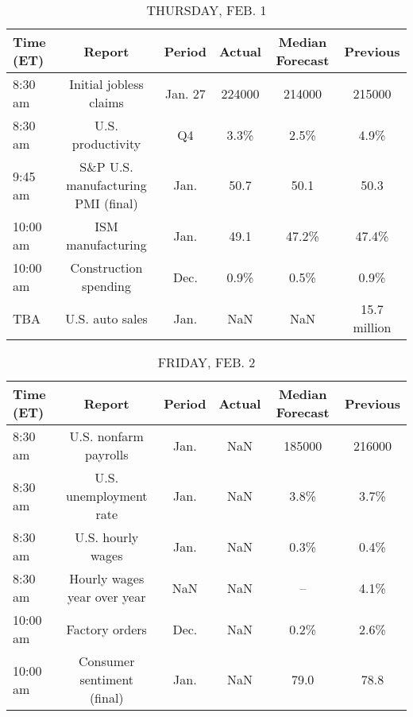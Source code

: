 \documentclass{article}%
\begin{document}
%


\begin{table}[htbp]%
\caption{THURSDAY, FEB. 1}%
\centering%
\begin{adjustbox}{width=1\textwidth}%
\begin{tabular}{lccccc}
\toprule
Time (ET) &                             Report &  Period & Actual & Median Forecast &     Previous \\
\midrule
  8:30 am &             Initial jobless claims & Jan. 27 & 224000 &          214000 &       215000 \\
  8:30 am &                  U.S. productivity &      Q4 &   3.3\% &            2.5\% &         4.9\% \\
  9:45 am & S\&P U.S. manufacturing PMI (final) &    Jan. &   50.7 &            50.1 &         50.3 \\
 10:00 am &                  ISM manufacturing &    Jan. &   49.1 &           47.2\% &        47.4\% \\
 10:00 am &              Construction spending &    Dec. &   0.9\% &            0.5\% &         0.9\% \\
      TBA &                    U.S. auto sales &    Jan. &    NaN &             NaN & 15.7 million \\
\bottomrule
\end{tabular}
%
\end{adjustbox}%
\end{table}

%


\begin{table}[htbp]%
\caption{FRIDAY, FEB. 2}%
\centering%
\begin{adjustbox}{width=1\textwidth}%
\begin{tabular}{lccccc}
\toprule
Time (ET) &                      Report & Period & Actual & Median Forecast & Previous \\
\midrule
  8:30 am &       U.S. nonfarm payrolls &   Jan. &    NaN &          185000 &   216000 \\
  8:30 am &      U.S. unemployment rate &   Jan. &    NaN &            3.8\% &     3.7\% \\
  8:30 am &           U.S. hourly wages &   Jan. &    NaN &            0.3\% &     0.4\% \\
  8:30 am & Hourly wages year over year &    NaN &    NaN &              -- &     4.1\% \\
 10:00 am &              Factory orders &   Dec. &    NaN &            0.2\% &     2.6\% \\
 10:00 am &  Consumer sentiment (final) &   Jan. &    NaN &            79.0 &     78.8 \\
\bottomrule
\end{tabular}
%
\end{adjustbox}%
\end{table}
\end{document}
